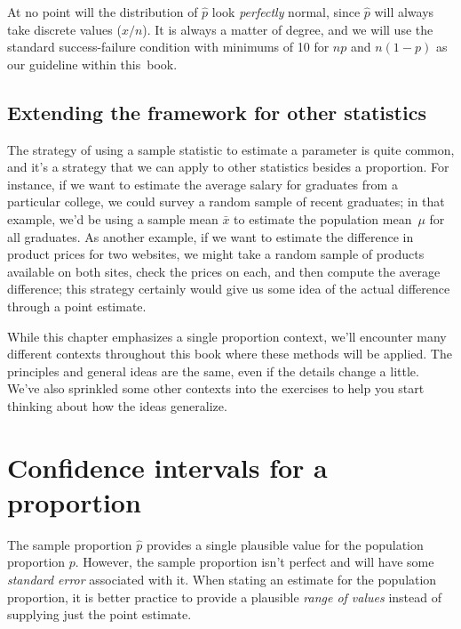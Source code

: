 At no point will the distribution of $\hat{p}$ look
\emph{perfectly} normal, since $\hat{p}$ will always
take discrete values ($x / n$).
It is always a matter of degree, and we will use
the standard success-failure condition with minimums
of 10 for $np$ and $n (1 - p)$ as our guideline
within this~book.


\subsection{Extending the framework for other statistics}

The strategy of using a sample statistic to estimate
a parameter is quite common, and it's a strategy that
we can apply to other statistics besides a proportion.
For instance, if we want to estimate the average salary
for graduates from a particular college, we could
survey a random sample of recent graduates;
in that example, we'd be using a sample mean $\bar{x}$
to estimate the population mean~$\mu$ for all graduates.
As another example, if we want to estimate the
difference in product prices for two websites,
we might take a random sample of products available
on both sites, check the prices on each,
and then compute the average difference;
this strategy certainly would give us some idea
of the actual difference through a point estimate.

While this chapter emphasizes a single proportion
context, we'll encounter many different contexts
throughout this book where these methods will be
applied.
The principles and general ideas are the same,
even if the details change a little.
We've also sprinkled some other contexts into
the exercises to help you start thinking about
how the ideas generalize.


{}





\section{Confidence intervals for a proportion}
\label{confidenceIntervals}


The sample proportion $\hat{p}$ provides a single plausible value
for the population proportion $p$. However, the sample proportion
isn't perfect and will have some \emph{standard error}
associated with it.
When stating an estimate for the population  proportion,
it is better practice to provide a plausible
\emph{range of values} instead of supplying just the point
estimate.



